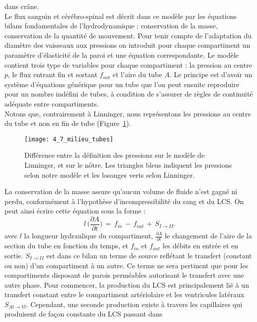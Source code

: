 dans crâne.\\
Le flux sanguin et cérébro-spinal est décrit dans ce modèle par les équations bilans fondamentales
de l’hydrodynamique : conservation de la masse, conservation de la quantité de mouvement. Pour
tenir compte de l’adaptation du diamètre des vaisseaux aux pressions on introduit pour chaque
compartiment un paramètre d’élasticité de la paroi et une équation correspondante. Le modèle
contient trois type de variables pour chaque compartiment : la pression au centre $p$, le flux entrant fin
et sortant $f_{out}$ et l’aire du tube $A$. Le principe est d’avoir un système d’équations générique pour un
tube que l’on peut ensuite reproduire pour un nombre indéfini de tubes, à condition de s’assurer de
règles de continuité adéquate entre compartiments.\\
Notons que, contrairement à Linninger, nous représentons les pressions au centre du tube et non
en fin de tube (Figure~\ref{fig:4_7_milieu_tubes}).\\
\begin{figure}[!t]
\centering
\texttt{[image: 4\_7\_milieu\_tubes]}
\caption{Différence entre la définition des pressions sur le modèle de Linninger, et sur le nôtre. Les triangles bleus
indiquent les pressions selon notre modèle et les losanges verts selon Linninger.}
\label{fig:4_7_milieu_tubes}	
\end{figure}
La conservation de la masse assure qu’aucun volume de fluide n’est gagné ni perdu,
conformément à l’hypothèse d’incompressibilité du sang et du LCS. On peut ainsi écrire cette équation
sous la forme :
\begin{equation}
l\,\biggr(\frac{\partial A}{\partial t}\biggr)\,=\,f_{in}\,-\,f_{out}\,+\,S_{I\rightarrow II}.
\end{equation}
avec $l$ la longueur hydraulique du compartiment, $\frac{\partial A}{\partial t}$
le changement de l’aire de la section du tube en
fonction du temps, et $f_{in}$ et $f_{out}$ les débits en entrée et en sortie. $S_{I \rightarrow II}$ est dans ce bilan un terme de
source reflétant le transfert (constant ou non) d’un compartiment à un autre. Ce terme ne sera
pertinent que pour les compartiments disposant de parois perméables autorisant le transfert avec une autre phase. Pour commencer, la production du LCS est principalement lié à un transfert constant
entre le compartiment artériolaire et les ventricules latéraux $S_{Al\rightarrow Vl}$. Cependant, une seconde
production existe à travers les capillaires qui produisent de façon constante du LCS passant dans
